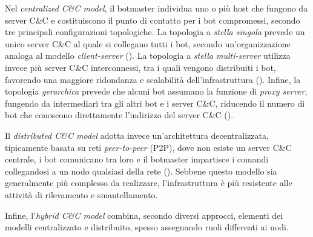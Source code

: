 Nel \emph{centralized C\&C model}, il botmaster individua uno o più host che fungono da server C\&C e costituiscono il punto di contatto per i bot compromessi, secondo tre principali configurazioni topologiche. La topologia a \emph{stella singola} prevede un unico server C\&C al quale si collegano tutti i bot, secondo un'organizzazione analoga al modello \emph{client-server} (). La topologia a \emph{stella multi-server} utilizza invece più server C\&C interconnessi, tra i quali vengono distribuiti i bot, favorendo una maggiore ridondanza e scalabilità dell'infrastruttura (). Infine, la topologia \emph{gerarchica} prevede che alcuni bot assumano la funzione di \emph{proxy server}, fungendo da intermediari tra gli altri bot e i server C\&C, riducendo il numero di bot che conoscono direttamente l'indirizzo del server C\&C ().


Il \emph{distributed C\&C model} adotta invece un'architettura decentralizzata, tipicamente basata su reti \emph{peer-to-peer} (P2P), dove non esiste un server C\&C centrale, i bot comunicano tra loro e il botmaster impartisce i comandi collegandosi a un nodo qualsiasi della rete (). Sebbene questo modello sia generalmente più complesso da realizzare, l'infrastruttura è più resistente alle attività di rilevamento e smantellamento.

Infine, l'\emph{hybrid C\&C model} combina, secondo diversi approcci, elementi dei modelli centralizzato e distribuito, spesso assegnando ruoli differenti ai nodi. %


